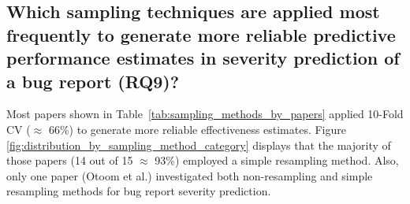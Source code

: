 
\subsection{Which sampling techniques are applied most frequently to generate more reliable predictive performance estimates in severity prediction of a bug report (RQ9)?}\label{subsec:rq9_result}

Most papers shown in Table~\ref{tab:sampling_methods_by_papers} applied 10-Fold CV ($\approx$ 66\%) to generate more reliable effectiveness estimates. Figure \ref{fig:distribution_by_sampling_method_category} displays that the majority of those papers (14 out of 15 $\approx$ 93\%) employed a simple resampling method. Also, only one paper (Otoom et al.\cite{Otoom:2016}) investigated both non-resampling and simple resampling methods for bug report severity prediction. 


